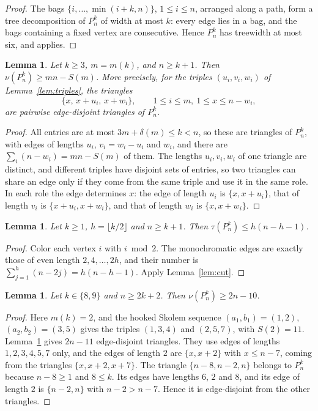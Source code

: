 \documentclass{amsart}
\newtheorem{lemma}[theorem]{Lemma}
\theoremstyle{definition}
\theoremstyle{remark}
\numberwithin{equation}{section}
\numberwithin{table}{section}
\begin{document}
\begin{proof}
The bags $\{i,\dots,\min(i+k,n)\}$, $1\le i\le n$, arranged along a path, form a tree decomposition of $P_n^k$ of width at most $k$: every edge lies in a bag, and the bags containing a fixed vertex are consecutive. Hence $P_n^k$ has treewidth at most six, and \cite[Theorem~3.4]{BFG} applies.
\end{proof}

\begin{lemma}\label{lem:pathpacking}
Let $k\ge3$, $m=m(k)$, and $n\ge k+1$. Then $\nu(P_n^k)\ge mn-S(m)$. More precisely, for the triples $(u_i,v_i,w_i)$ of Lemma~\ref{lem:triples}, the triangles
\[
\{x,\,x+u_i,\,x+w_i\},\qquad 1\le i\le m,\ 1\le x\le n-w_i,
\]
are pairwise edge-disjoint triangles of $P_n^k$.
\end{lemma}

\begin{proof}
All entries are at most $3m+\delta(m)\le k<n$, so these are triangles of $P_n^k$, with edges of lengths $u_i$, $v_i=w_i-u_i$ and $w_i$, and there are $\sum_i(n-w_i)=mn-S(m)$ of them. The lengths $u_i,v_i,w_i$ of one triangle are distinct, and different triples have disjoint sets of entries, so two triangles can share an edge only if they come from the same triple and use it in the same role. In each role the edge determines $x$: the edge of length $u_i$ is $\{x,x+u_i\}$, that of length $v_i$ is $\{x+u_i,x+w_i\}$, and that of length $w_i$ is $\{x,x+w_i\}$.
\end{proof}

\begin{lemma}\label{lem:paritypath}
Let $k\ge1$, $h=\lfloor k/2\rfloor$ and $n\ge k+1$. Then $\tau(P_n^k)\le h(n-h-1)$.
\end{lemma}

\begin{proof}
Color each vertex $i$ with $i\bmod2$. The monochromatic edges are exactly those of even length $2,4,\dots,2h$, and their number is $\sum_{j=1}^h(n-2j)=h(n-h-1)$. Apply Lemma~\ref{lem:cut}.
\end{proof}

\begin{lemma}\label{lem:repair}
Let $k\in\{8,9\}$ and $n\ge2k+2$. Then $\nu(P_n^k)\ge2n-10$.
\end{lemma}

\begin{proof}
Here $m(k)=2$, and the hooked Skolem sequence $(a_1,b_1)=(1,2)$, $(a_2,b_2)=(3,5)$ gives the triples $(1,3,4)$ and $(2,5,7)$, with $S(2)=11$. Lemma~\ref{lem:pathpacking} gives $2n-11$ edge-disjoint triangles. They use edges of lengths $1,2,3,4,5,7$ only, and the edges of length $2$ are $\{x,x+2\}$ with $x\le n-7$, coming from the triangles $\{x,x+2,x+7\}$. The triangle $\{n-8,n-2,n\}$ belongs to $P_n^k$ because $n-8\ge1$ and $8\le k$. Its edges have lengths $6$, $2$ and $8$, and its edge of length $2$ is $\{n-2,n\}$ with $n-2>n-7$. Hence it is edge-disjoint from the other triangles.
\end{proof}
\end{document}
